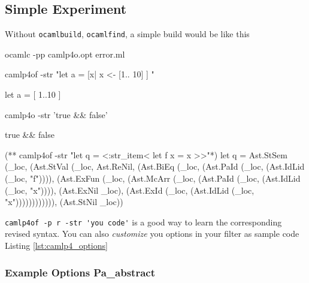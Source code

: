 \subsection{Simple Experiment}


Without \verb|ocamlbuild|, \verb|ocamlfind|, a simple build would be like this 

\begin{bashcode}
ocamlc -pp camlp4o.opt error.ml
\end{bashcode}  

\begin{bashcode}
camlp4of -str "let a = [x| x <- [1.. 10] ] "
\end{bashcode}

\begin{ocamlcode}
 let a = [ 1..10 ]
\end{ocamlcode}

\begin{bashcode}
 camlp4o -str 'true && false'
\end{bashcode}

\begin{ocamlcode}
true && false
\end{ocamlcode}


\begin{ocamlcode}
(** camlp4of -str "let q = <:str_item< let f x = x >>"*)
let q =
  Ast.StSem (_loc,
    (Ast.StVal (_loc, Ast.ReNil,
       (Ast.BiEq (_loc,
          (Ast.PaId (_loc, (Ast.IdLid (_loc, "f")))),
          (Ast.ExFun (_loc,
             (Ast.McArr
                (_loc,
                (Ast.PaId (_loc, (Ast.IdLid (_loc, "x")))),
                (Ast.ExNil _loc), (Ast.ExId (_loc, (Ast.IdLid (_loc, "x")))))))))))),
    (Ast.StNil _loc))
\end{ocamlcode}


\verb|camlp4of -p r -str 'you code'| is a good way to learn the
corresponding revised syntax.  You can also \textit{customize} you
options in your filter as sample code Listing \ref{lst:camlp4_options}
\subsubsection{Example Options Pa\_abstract}

\inputminted[fontsize=\scriptsize,
firstline=19,lastline=26]{ocaml}{camlp4/examples/pa_abstract.ml}


